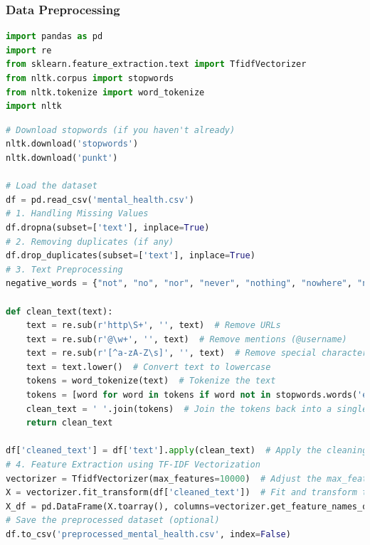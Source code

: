 \subsubsection{Data Preprocessing}

\begin{tcolorbox}[colback=gray!5!white, colframe=gray!80!black, boxrule=0.5pt, title=Data Preprocessing]
    \begin{lstlisting}[language=Python]
import pandas as pd
import re
from sklearn.feature_extraction.text import TfidfVectorizer
from nltk.corpus import stopwords
from nltk.tokenize import word_tokenize
import nltk
\end{lstlisting}
\end{tcolorbox}

\begin{tcolorbox}[colback=gray!5!white, colframe=gray!80!black, boxrule=0.5pt, title=Data Preprocessing]
    \begin{lstlisting}[language=Python]
# Download stopwords (if you haven't already)
nltk.download('stopwords')
nltk.download('punkt')

# Load the dataset
df = pd.read_csv('mental_health.csv')
# 1. Handling Missing Values
df.dropna(subset=['text'], inplace=True)
# 2. Removing duplicates (if any)
df.drop_duplicates(subset=['text'], inplace=True)
# 3. Text Preprocessing
negative_words = {"not", "no", "nor", "never", "nothing", "nowhere", "neither", "cannot", "n't", "without", "barely", "hardly", "scarcely"}

def clean_text(text):
    text = re.sub(r'http\S+', '', text)  # Remove URLs
    text = re.sub(r'@\w+', '', text)  # Remove mentions (@username)
    text = re.sub(r'[^a-zA-Z\s]', '', text)  # Remove special characters, numbers, and punctuations
    text = text.lower()  # Convert text to lowercase
    tokens = word_tokenize(text)  # Tokenize the text
    tokens = [word for word in tokens if word not in stopwords.words('english') or word in negative_words]  # Remove stopwords, but keep negative words
    clean_text = ' '.join(tokens)  # Join the tokens back into a single string
    return clean_text

df['cleaned_text'] = df['text'].apply(clean_text)  # Apply the cleaning function to the 'text' column
# 4. Feature Extraction using TF-IDF Vectorization
vectorizer = TfidfVectorizer(max_features=10000)  # Adjust the max_features
X = vectorizer.fit_transform(df['cleaned_text'])  # Fit and transform the cleaned text data
X_df = pd.DataFrame(X.toarray(), columns=vectorizer.get_feature_names_out())  # Convert the result to a DataFrame for easier understanding
# Save the preprocessed dataset (optional)
df.to_csv('preprocessed_mental_health.csv', index=False)
\end{lstlisting}
\end{tcolorbox}


